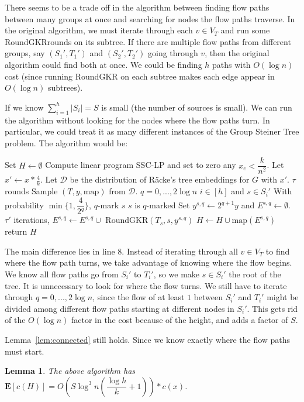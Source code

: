 \documentclass[12pt]{article}
\newtheorem{lemma}{Lemma}
\begin{document}
There seems to be a trade off in the algorithm between finding flow paths between many groups at once and searching for nodes the flow paths traverse. In the original algorithm, we must iterate through each $v \in V_T$ and run some RoundGKRrounds on its subtree. If there are multiple flow paths from different groups, say $(S_1', T_1')$ and $(S_2', T_2')$ going through $v$, then the original algorithm could find both at once. We could be finding $h$ paths with $O(\log n)$ cost (since running RoundGKR on each subtree makes each edge appear in $O(\log n)$ subtrees). 

If we know $\sum_{i=1}^h |S_i| = S$ is small (the number of sources is small). We can run the algorithm without looking for the nodes where the flow paths turn. In particular, we could treat it as many different instances of the Group Steiner Tree problem. The algorithm would be:
\begin{codebox}
\li Set $H \leftarrow \emptyset$
\li Compute linear program SSC-LP and set to zero any $x_e < \dfrac{k}{n^2}$.
\li Let $x' \leftarrow x*\frac{4}{k}$. 
\li Let $\mathcal{D}$ be the distribution of R\"{a}cke's tree embeddings for $G$ with $x'$.
\li \For $\tau$ rounds \Do
\li Sample $(T, y, \text{map})$ from $\mathcal{D}$. 
\li \For $q = 0, ..., 2\log n$ \Do
\li \For \For $i \in [h]$ and $s \in S_i'$ \Do
\li With probability $\min\{1, \dfrac{4}{2^q}\}$, $q$-mark $s$
\li \If $s$ is $q$-marked \Then
\li Set $y^{s, q}\leftarrow 2^{q+1}y$ and $E^{s,q} \leftarrow \emptyset$.
\li \For $\tau'$ iterations, \Do
\li $E^{s,q} \leftarrow E^{s,q} \cup$ RoundGKR$(T_s, s, y^{s,q})$ \End
\li $H \leftarrow H \cup \text{map}(E^{s,q})$ \End \End \End \End
\li return $H$
\end{codebox}
The main difference lies in line 8. Instead of iterating through all $v \in V_T$ to find where the flow path turns, we take advantage of knowing where the flow begins. We know all flow paths go from $S_i'$ to $T_i'$, so we make $s \in S_i'$ the root of the tree. It is unnecessary to look for where the flow turns. We still have to iterate through $q= 0, ..., 2\log n$, since the flow of at least $1$ between $S_i'$ and $T_i'$ might be divided among different flow paths starting at different nodes in $S_i'$. This gets rid of the $O(\log n)$ factor in the cost because of the height, and adds a factor of $S$.

Lemma~\ref{lem:connected} still holds. Since we know exactly where the flow paths must start.

\begin{lemma}
The above algorithm has $\textbf{E}[c(H)] = O(S\log^3 n(\dfrac{\log h}{k} + 1))*c(x)$.
\end{lemma}
\end{document}
